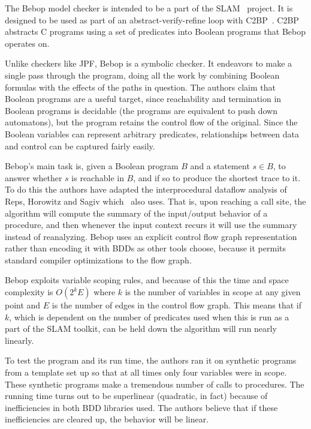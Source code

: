 \documentclass{article}
\begin{document}
\begin{multicols}{2}
The Bebop model checker is intended to be a part of the
SLAM~\cite{503274} project.  It is designed to be used as part of an
abstract-verify-refine loop with C2BP~\cite{ball01automatic}.  C2BP
abstracts C programs using a set of predicates into Boolean programs
that Bebop operates on.

Unlike checkers like JPF, Bebop is a symbolic checker.  It endeavors
to make a single pass through the program, doing all the work by
combining Boolean formulas with the effects of the paths in question.
The authors claim that Boolean programs are a useful target, since
reachability and termination in Boolean programs is decidable (the
programs are equivalent to push down automatons), but the program
retains the control flow of the original.  Since the Boolean variables
can represent arbitrary predicates, relationships between data and
control can be captured fairly easily.

Bebop's main task is, given a Boolean program $B$ and a statement $s
\in B$, to answer whether $s$ is reachable in $B$, and if so to
produce the shortest trace to it.  To do this the authors have adapted
the interprocedural dataflow analysis of Reps, Horowitz and
Sagiv\cite{reps95precise} which~\cite{512538} also uses.  That is,
upon reaching a call site, the algorithm will compute the summary of
the input/output behavior of a procedure, and then whenever the input
context recurs it will use the summary instead of reanalyzing.  Bebop
uses an explicit control flow graph representation rather than
encoding it with BDDs as other tools choose, because it permits
standard compiler optimizations to the flow graph.

Bebop exploits variable scoping rules, and because of this the time
and space complexity is $O(2^k E)$ where $k$ is the number of
variables in scope at any given point and $E$ is the number of edges
in the control flow graph.  This means that if $k$, which is dependent
on the number of predicates used when this is run as a part of the
SLAM toolkit, can be held down the algorithm will run nearly linearly.

To test the program and its run time, the authors ran it on synthetic
programs from a template set up so that at all times only four
variables were in scope.  These synthetic programs make a tremendous
number of calls to procedures.  The running time turns out to be
superlinear (quadratic, in fact) because of inefficiencies in both BDD
libraries used.  The authors believe that if these inefficiencies are
cleared up, the behavior will be linear.


\end{multicols}
\end{document}
